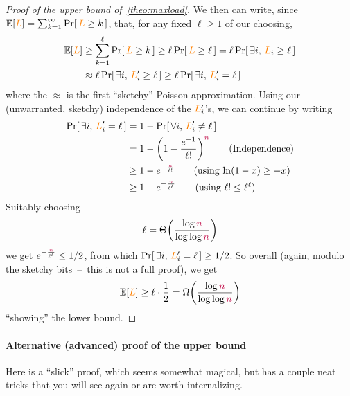 \begin{proof}[Proof of the upper bound of~\cref{theo:maxload}]
We then can write, since $\expect{\orange{L}} = \sum_{k=1}^\infty \probaOf{\orange{L} \geq k}$, that, for any fixed $\ell\geq 1$ of our choosing,
\begin{align*}
\expect{\orange{L}} &\geq \sum_{k=1}^\ell \probaOf{\orange{L} \geq k} \geq \ell \probaOf{\orange{L} \geq \ell} = 
\ell \probaOf{\exists i,\, \orange{L}_i \geq \ell}
\\
&\approx \ell \probaOf{\exists i,\, \orange{L}'_i \geq \ell}
\geq  \ell \probaOf{\exists i,\, \orange{L}'_i = \ell}
\end{align*}
where the $\approx$ is the first ``sketchy'' Poisson approximation. Using our (unwarranted, sketchy) independence of the $\textcolor{orange}{L}'_i$'s, we can continue by writing
\begin{align*}
\probaOf{\exists i,\, \orange{L}'_i = \ell}
&= 1-\probaOf{\forall i,\, \orange{L}'_i \neq \ell} \\
&= 1-\Paren{ 1- \frac{e^{-1}}{\ell!} }^{\nbins} \tag{Independence}\\
&\geq 1-e^{-\frac{\nbins}{\ell!}} \tag{using $\ln(1-x)\geq -x$}\\
&\geq 1-e^{-\frac{\nbins}{\ell^\ell}} \tag{using $\ell! \leq \ell^\ell$}\\
\end{align*}
Suitably choosing \[
\ell = \bigTheta{\frac{\log\nbins}{\log\log\nbins}}
\] we get $e^{-\frac{\textcolor{purple}{n}}{\ell^\ell}} \leq 1/2$, from which $\probaOf{\exists i,\, \orange{L}'_i = \ell} \geq 1/2$. So overall (again, modulo the sketchy bits~--~this is not a full proof), we get
\[
\expect{\orange{L}} \geq \ell \cdot \frac{1}{2} = \bigOmega{\frac{\log\nbins}{\log\log\nbins}}
\]
``showing'' the lower bound.
\end{proof}

\paragraph{Alternative (advanced) proof of the upper bound \advancedstuff} Here is a ``slick'' proof, which seems somewhat magical, but has a couple neat tricks that you will see again or are worth internalizing.

